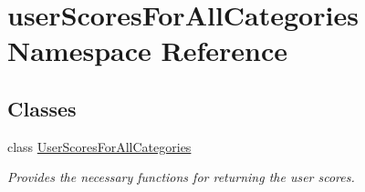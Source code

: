 \hypertarget{namespaceuserScoresForAllCategories}{\section{user\-Scores\-For\-All\-Categories Namespace Reference}
\label{namespaceuserScoresForAllCategories}
}
\subsection*{Classes}
\begin{DoxyCompactItemize}
\item 
class \hyperlink{classuserScoresForAllCategories_1_1UserScoresForAllCategories}{User\-Scores\-For\-All\-Categories}
\begin{DoxyCompactList}\small\item\em Provides the necessary functions for returning the user scores. \end{DoxyCompactList}\end{DoxyCompactItemize}
